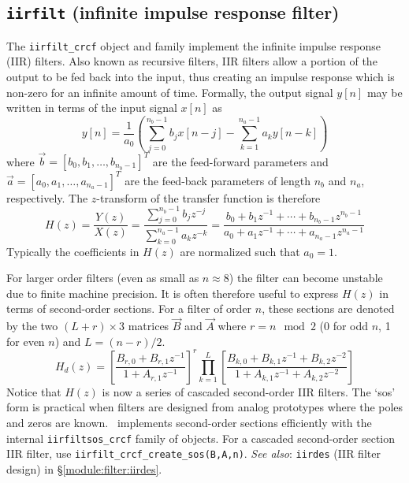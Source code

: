 \subsection{{\tt iirfilt} (infinite impulse response filter)}
\label{module:filter:iirfilt}
The {\tt iirfilt\_crcf} object and family implement the infinite impulse
response (IIR) filters.
Also known as recursive filters, IIR filters allow a portion of the output to
be fed back into the input, thus creating an impulse response which is
non-zero for an infinite amount of time.
Formally, the output signal $y[n]$ may be written in terms of the input signal
$x[n]$ as
%
\begin{equation}
\label{eqn:filter:iirfilt:y}
    y[n] = \frac{1}{a_0} \left(
           \sum_{j=0}^{n_b-1}{ b_j x[n-j] } -
           \sum_{k=1}^{n_a-1}{ a_k y[n-k] }
           \right)
\end{equation}
%
where $\vec{b} = [b_0,b_1,\ldots,b_{n_b-1}]^T$ are the feed-forward parameters
and   $\vec{a} = [a_0,a_1,\ldots,a_{n_a-1}]^T$ are the feed-back parameters
of length $n_b$ and $n_a$, respectively.
The $z$-transform of the transfer function is therefore
%
\begin{equation}
\label{eqn:filter:iirfilt:Hz}
    H(z) = \frac{Y(z)}{X(z)}
         = \frac{\sum\limits_{j=0}^{n_b-1}{b_j z^{-j}}}
                {\sum\limits_{k=0}^{n_a-1}{a_k z^{-k}}}
         = \frac{ b_0 + b_1 z^{-1} + \cdots + b_{n_b-1} z^{n_b-1}}
                { a_0 + a_1 z^{-1} + \cdots + a_{n_a-1} z^{n_a-1}}
\end{equation}
%
Typically the coefficients in $H(z)$ are normalized such that $a_0=1$.

For larger order filters (even as small as $n\approx 8$) the filter can become
unstable due to finite machine precision.
It is often therefore useful to express $H(z)$ in terms of second-order
sections.
For a filter of order $n$, these sections are denoted by the two
$(L+r)\times 3$ matrices $\vec{B}$ and $\vec{A}$
where $r=n \mod 2$ (0 for odd $n$, 1 for even $n$) and $L=(n-r)/2$.
%
\begin{equation}
\label{eqn:filter:iirfilt:Hdz}
    H_d(z) = 
             \left[
                \frac{B_{r,0} + B_{r,1}z^{-1}}
                     {1       + A_{r,1}z^{-1}}
             \right]^r
             \prod_{k=1}^{L} {\left[
                \frac{B_{k,0} + B_{k,1}z^{-1} + B_{k,2}z^{-2}}
                     {1       + A_{k,1}z^{-1} + A_{k,2}z^{-2}}
             \right]}
\end{equation}
%
Notice that $H(z)$ is now a series of cascaded second-order IIR filters.
The `sos' form is practical when filters are designed from analog prototypes
where the poles and zeros are known.
\liquid\ implements second-order sections efficiently with the internal
{\tt iirfiltsos\_crcf} family of objects.
For a cascaded second-order section IIR filter, use
{\tt iirfilt\_crcf\_create\_sos(B,A,n)}.
%
{\em See also}: {\tt iirdes} (IIR filter design) in
\S\ref{module:filter:iirdes}.

